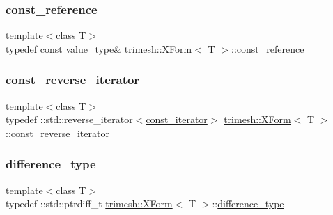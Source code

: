 \mbox{\label{classtrimesh_1_1XForm_a33bd450d8902f70aaf7d4bf9fec01502}} 
\subsubsection{\texorpdfstring{const\+\_\+reference}{const\_reference}}
{\footnotesize\ttfamily template$<$class T$>$ \\
typedef const \hyperlink{classtrimesh_1_1XForm_af259af02eaea86d3451dc23a47ad896c}{value\+\_\+type}\& \hyperlink{classtrimesh_1_1XForm}{trimesh\+::\+X\+Form}$<$ T $>$\+::\hyperlink{classtrimesh_1_1XForm_a33bd450d8902f70aaf7d4bf9fec01502}{const\+\_\+reference}}

\mbox{\label{classtrimesh_1_1XForm_a00d4231576ef7499e29885da090e807f}} 
\subsubsection{\texorpdfstring{const\+\_\+reverse\+\_\+iterator}{const\_reverse\_iterator}}
{\footnotesize\ttfamily template$<$class T$>$ \\
typedef \+::std\+::reverse\+\_\+iterator$<$\hyperlink{classtrimesh_1_1XForm_af342cefd0ecc382861c2d89f24423d71}{const\+\_\+iterator}$>$ \hyperlink{classtrimesh_1_1XForm}{trimesh\+::\+X\+Form}$<$ T $>$\+::\hyperlink{classtrimesh_1_1XForm_a00d4231576ef7499e29885da090e807f}{const\+\_\+reverse\+\_\+iterator}}

\mbox{\label{classtrimesh_1_1XForm_aed93af27d498823c0b39184e9f81adec}} 
\subsubsection{\texorpdfstring{difference\+\_\+type}{difference\_type}}
{\footnotesize\ttfamily template$<$class T$>$ \\
typedef \+::std\+::ptrdiff\+\_\+t \hyperlink{classtrimesh_1_1XForm}{trimesh\+::\+X\+Form}$<$ T $>$\+::\hyperlink{classtrimesh_1_1XForm_aed93af27d498823c0b39184e9f81adec}{difference\+\_\+type}}

